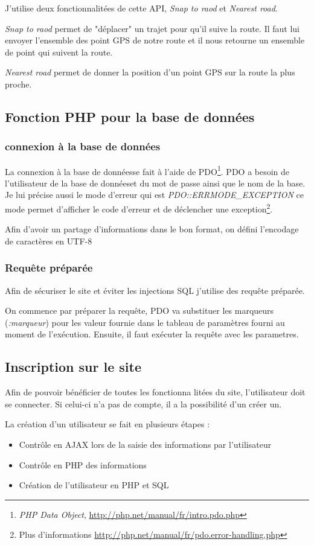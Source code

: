 \documentclass[a4paper]{article}
\newcommand{\bdd}{base de données}
\begin{document}
J'utilise deux fonctionnalitées de cette API, \emph{Snap to raod} et \emph{Nearest road}.

\emph{Snap to raod} permet de "déplacer" un trajet pour qu'il suive la route. Il faut lui envoyer l'ensemble des point GPS de notre route et il nous retourne un ensemble de point qui suivent la route.

\emph{Nearest road} permet de donner la position d'un point GPS sur la route la plus proche.

\subsection{Fonction PHP pour la \bdd}
\subsubsection{connexion à la \bdd}
La connexion à la \bdd se fait à l'aide de PDO\footnote{\emph{PHP Data Object}, \url{http://php.net/manual/fr/intro.pdo.php}}. PDO a besoin de l'utilisateur de la \bdd et du mot de passe ainsi que le nom de la base.
Je lui précise aussi le mode d'erreur qui est \emph{PDO::ERRMODE\_EXCEPTION} ce mode permet d'afficher le code d'erreur et de déclencher une exception\footnote{Plus d'informations \url{http://php.net/manual/fr/pdo.error-handling.php}}.

Afin d'avoir un partage d'informations dans le bon format, on défini l'encodage de caractères en UTF-8

\subsubsection{Requête préparée}
Afin de sécuriser le site et éviter les injections SQL j'utilise des requête préparée.

On commence par préparer la requête, PDO va substituer les marqueurs (\emph{:marqueur}) pour les valeur fournie dans le tableau de paramètres fourni au moment de l'exécution. Ensuite, il faut exécuter la requête avec les parametres.


\newpage
\subsection{Inscription sur le site}

Afin de pouvoir bénéficier de toutes les fonctionna litées du site, l'utilisateur doit se connecter. Si celui-ci n'a pas de compte, il a la possibilité d'un créer un. 

La création d'un utilisateur se fait en plusieurs étapes :
\begin{itemize}
    \item Contrôle en AJAX lors de la saisie des informations par l'utilisateur
    \item Contrôle en PHP des informations
    \item Création de l'utilisateur en PHP et SQL
\end{itemize}
\end{document}
